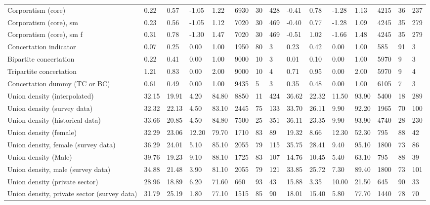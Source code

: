 \begin{longtable}{lllllllllllllll}
Corporatism (core) & 0.22 & 0.57 & -1.05 & 1.22 & 6930 & 30 & 428 & -0.41 & 0.78 & -1.28 & 1.13 & 4215 & 36 & 237\\
\addlinespace
Corporatism (core), sm & 0.23 & 0.56 & -1.05 & 1.12 & 7020 & 30 & 469 & -0.40 & 0.77 & -1.28 & 1.09 & 4245 & 35 & 279\\
Corporatism (core), sm f & 0.31 & 0.78 & -1.30 & 1.47 & 7020 & 30 & 469 & -0.51 & 1.02 & -1.66 & 1.48 & 4245 & 35 & 279\\
Concertation indicator & 0.07 & 0.25 & 0.00 & 1.00 & 1950 & 80 & 3 & 0.23 & 0.42 & 0.00 & 1.00 & 585 & 91 & 3\\
Bipartite concertation & 0.22 & 0.41 & 0.00 & 1.00 & 9000 & 10 & 3 & 0.01 & 0.10 & 0.00 & 1.00 & 5970 & 9 & 3\\
Tripartite concertation & 1.21 & 0.83 & 0.00 & 2.00 & 9000 & 10 & 4 & 0.71 & 0.95 & 0.00 & 2.00 & 5970 & 9 & 4\\
\addlinespace
Concertation dummy (TC or BC) & 0.61 & 0.49 & 0.00 & 1.00 & 9435 & 5 & 3 & 0.35 & 0.48 & 0.00 & 1.00 & 6105 & 7 & 3\\
Union density (interpolated) & 32.15 & 19.91 & 4.20 & 84.80 & 8850 & 11 & 424 & 36.62 & 22.32 & 11.50 & 93.90 & 5400 & 18 & 289\\
Union density (survey data) & 32.32 & 22.13 & 4.50 & 83.10 & 2445 & 75 & 133 & 33.70 & 26.11 & 9.90 & 92.20 & 1965 & 70 & 100\\
Union density (historical data) & 33.66 & 20.85 & 4.50 & 84.80 & 7500 & 25 & 351 & 36.11 & 23.35 & 9.90 & 93.90 & 4740 & 28 & 230\\
Union density (female) & 32.29 & 23.06 & 12.20 & 79.70 & 1710 & 83 & 89 & 19.32 & 8.66 & 12.30 & 52.30 & 795 & 88 & 42\\
\addlinespace
Union density, female (survey data) & 36.29 & 24.01 & 5.10 & 85.10 & 2055 & 79 & 115 & 35.75 & 28.41 & 9.40 & 95.10 & 1800 & 73 & 86\\
Union density (Male) & 39.76 & 19.23 & 9.10 & 88.10 & 1725 & 83 & 107 & 14.76 & 10.45 & 5.40 & 63.10 & 795 & 88 & 39\\
Union density, male (survey data) & 34.88 & 21.48 & 3.90 & 81.10 & 2055 & 79 & 121 & 33.85 & 25.72 & 7.30 & 89.40 & 1800 & 73 & 101\\
Union density (private sector) & 28.96 & 18.89 & 6.20 & 71.60 & 660 & 93 & 43 & 15.88 & 3.35 & 10.00 & 21.50 & 645 & 90 & 33\\
Union density, private sector (survey data) & 31.79 & 25.19 & 1.80 & 77.10 & 1515 & 85 & 90 & 18.01 & 15.40 & 5.80 & 77.70 & 1440 & 78 & 70\\

\end{longtable}
